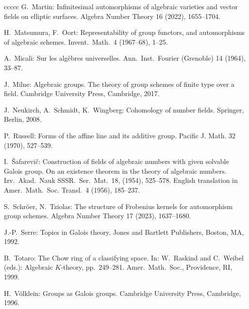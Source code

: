 \begin{thebibliography}{ccccc}
G.\ Martin:
Infinitesimal automorphisms of algebraic varieties 
and vector fields on elliptic surfaces.
Algebra Number Theory 16 (2022),  1655--1704. 

H.\ Matsumura, F.\ Oort:
Representability of group functors, and automorphisms of algebraic schemes.
Invent.\ Math.\ 4 (1967--68), 1--25. 

A.\ Micali:
Sur les algèbres universelles.
Ann.\ Inst.\ Fourier (Grenoble) 14 (1964), 33--87.

J.\ Milne:
Algebraic groups. The theory of group schemes
of finite type over a field.
Cambridge University Press, Cambridge, 2017.

J.\ Neukirch, A.\  Schmidt, K.\ Wingberg:
Cohomology of number fields. 
Springer, Berlin, 2008.

P.\ Russell:
Forms of the affine line and its additive group.
Pacific J. Math. 32 (1970), 527--539.

I.\ \v{S}afarevi\v{c}:
Construction of fields of algebraic numbers with given solvable Galois group. 
On an existence theorem in the theory of algebraic numbers.  
Izv.\ Akad.\ Nauk SSSR.\ Ser.\ Mat.\ 18, (1954), 525--578. 
English translation in Amer.\ Math.\ Soc. Transl.\ 4 (1956), 185--237.

S.\ Schr\"oer, N.\ Tziolas:
The structure of Frobenius kernels for automorphism group schemes.
Algebra Number Theory 17 (2023),  1637--1680. 

J.-P.\ Serre:
Topics in Galois theory.
Jones and Bartlett Publishers, Boston, MA, 1992.
 
B.\ Totaro:
The Chow ring of a classifying space. 
In: 
W.\ Raskind and C.\ Weibel (eds.): Algebraic $K$-theory, pp.\ 249--281.
Amer.\ Math.\ Soc., Providence, RI, 1999. 

H.\ V\"olklein:
Groups as Galois groups.
Cambridge University Press, Cambridge, 1996.

\end{thebibliography}
